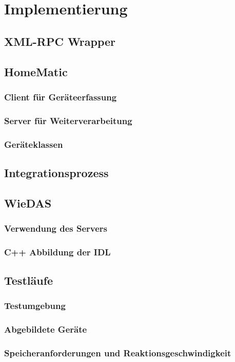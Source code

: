 \chapter{Implementierung}

\section{XML-RPC Wrapper}

\section{HomeMatic}

\subsection{Client für Geräteerfassung}

\subsection{Server für Weiterverarbeitung}

\subsection{Geräteklassen}

\section{Integrationsprozess}

\section{WieDAS}

\subsection{Verwendung des Servers}

\subsection{C++ Abbildung der IDL}

\section{Testläufe}

\subsection{Testumgebung}

\subsection{Abgebildete Geräte}

\subsection{Speicheranforderungen und Reaktionsgeschwindigkeit}
